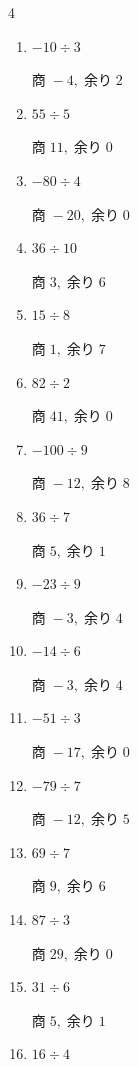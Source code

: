\begin{multicols}{4}
\begin{enumerate}
  \item $-10 \div 3$

        $商\; -4,\; 余り\; 2$

  \item $55 \div 5$

        $商\; 11,\; 余り\; 0$

  \item $-80 \div 4$

        $商\; -20,\; 余り\; 0$

  \item $36 \div 10$

        $商\; 3,\; 余り\; 6$

  \item $15 \div 8$

        $商\; 1,\; 余り\; 7$

  \item $82 \div 2$

        $商\; 41,\; 余り\; 0$

  \item $-100 \div 9$

        $商\; -12,\; 余り\; 8$

  \item $36 \div 7$

        $商\; 5,\; 余り\; 1$

  \item $-23 \div 9$

        $商\; -3,\; 余り\; 4$

  \item $-14 \div 6$

        $商\; -3,\; 余り\; 4$

  \item $-51 \div 3$

        $商\; -17,\; 余り\; 0$

  \item $-79 \div 7$

        $商\; -12,\; 余り\; 5$

  \item $69 \div 7$

        $商\; 9,\; 余り\; 6$

  \item $87 \div 3$

        $商\; 29,\; 余り\; 0$

  \item $31 \div 6$

        $商\; 5,\; 余り\; 1$

  \item $16 \div 4$


\end{enumerate}
\end{multicols}

